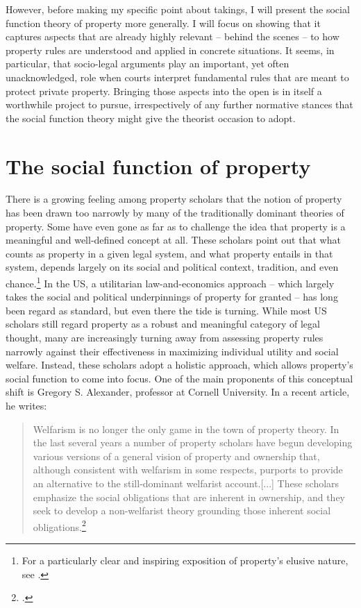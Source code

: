 However, before making my specific point about takings, I will present the social function theory of property more generally. I will focus on showing that it captures aspects that are already highly relevant -- behind the scenes -- to how property rules are understood and applied in concrete situations. It seems, in particular, that socio-legal arguments play an important, yet often unacknowledged, role when courts interpret fundamental rules that are meant to protect private property. Bringing those aspects into the open is in itself a worthwhile project to pursue, irrespectively of any further normative stances that the social function theory might give the theorist occasion to adopt.

\section{The social function of property}

There is a growing feeling among property scholars that the notion of property has been drawn too narrowly by many of the traditionally dominant theories of property. Some have even gone as far as to challenge the idea that property is a meaningful and well-defined concept at all. These scholars point out that what counts as property in a given legal system, and what property entails in that system, depends largely on its social and political context, tradition, and even chance.\footnote{For a particularly clear and inspiring exposition of property's elusive nature, see \cite{gray91}.} In the US, a utilitarian law-and-economics approach -- which largely takes the social and political underpinnings of property for granted -- has long been regard as standard, but even there the tide is turning. While most US scholars still regard property as a robust and meaningful category of legal thought, many are increasingly turning away from assessing property rules narrowly against their effectiveness in maximizing individual utility and social welfare. Instead, these scholars adopt a holistic approach, which allows property's social function to come into focus. One of the main proponents of this conceptual shift is Gregory S. Alexander, professor at Cornell University. In a recent article, he writes:

\begin{quote} Welfarism is no longer the only game in the town of property theory. In the last several years a number of property scholars have begun developing various versions of a general vision of property and ownership that, although consistent with welfarism in some respects, purports to provide an alternative to the still-dominant welfarist account.[...] These scholars emphasize the social obligations that are inherent in ownership, and they seek to develop a non-welfarist theory grounding those inherent social obligations.\footcite[1017]{alexander11}
\end{quote}

